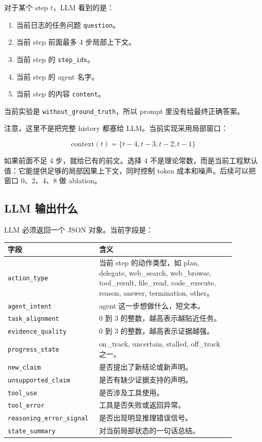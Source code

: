 \documentclass[UTF8,a4paper,11pt]{ctexart}
\begin{document}
对于某个 step $t$，LLM 看到的是：

\begin{enumerate}
  \item 当前日志的任务问题 \texttt{question}。
  \item 当前 step 前面最多 4 步局部上下文。
  \item 当前 step 的 \texttt{step\_idx}。
  \item 当前 step 的 agent 名字。
  \item 当前 step 的内容 \texttt{content}。
\end{enumerate}

当前实验是 \texttt{without\_ground\_truth}，所以 prompt 里没有给最终正确答案。

注意，这里不是把完整 history 都塞给 LLM。当前实现采用局部窗口：

\[
\text{context}(t) = \{t-4, t-3, t-2, t-1\}
\]

如果前面不足 4 步，就给已有的前文。选择 4 不是理论常数，而是当前工程默认值：它能提供足够的局部因果上下文，同时控制 token 成本和噪声。后续可以把窗口 0、2、4、8 做 ablation。

\subsection{LLM 输出什么}

LLM 必须返回一个 JSON 对象。当前字段是：

\begin{longtable}{p{0.30\linewidth}p{0.58\linewidth}}
\toprule
字段 & 含义 \\
\midrule
\endhead
\texttt{action\_type} & 当前 step 的动作类型，如 plan, delegate, web\_search, web\_browse, tool\_result, file\_read, code\_execute, reason, answer, termination, other。 \\
\texttt{agent\_intent} & agent 这一步想做什么，短文本。 \\
\texttt{task\_alignment} & 0 到 3 的整数，越高表示越贴近任务。 \\
\texttt{evidence\_quality} & 0 到 3 的整数，越高表示证据越强。 \\
\texttt{progress\_state} & on\_track, uncertain, stalled, off\_track 之一。 \\
\texttt{new\_claim} & 是否提出了新结论或新声明。 \\
\texttt{unsupported\_claim} & 是否有缺少证据支持的声明。 \\
\texttt{tool\_use} & 是否涉及工具使用。 \\
\texttt{tool\_error} & 工具是否失败或返回异常。 \\
\texttt{reasoning\_error\_signal} & 是否出现明显推理错误信号。 \\
\texttt{state\_summary} & 对当前局部状态的一句话总结。 \\
\bottomrule
\end{longtable}
\end{document}
